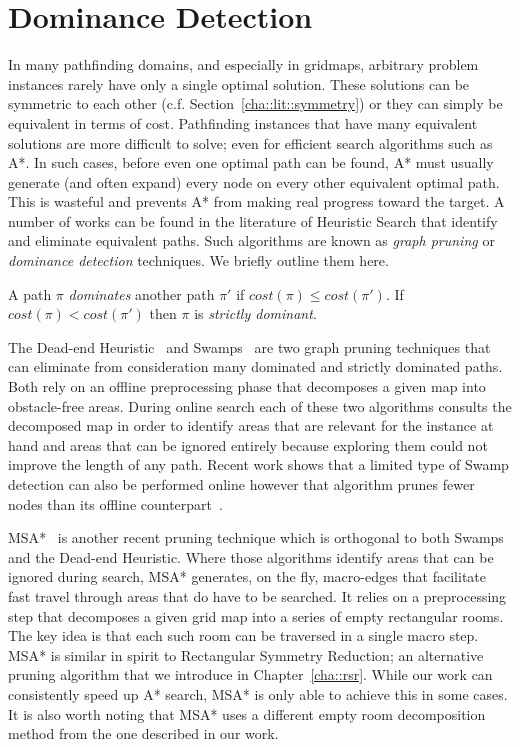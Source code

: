 \section{Dominance Detection}
\label{cha::lit::dominance}
In many pathfinding domains, and especially in gridmaps, arbitrary problem
instances rarely have only a single optimal solution. These solutions can be
symmetric to each other (c.f. Section~\ref{cha::lit::symmetry}) or they can
simply be equivalent in terms of cost.  Pathfinding instances that have many
equivalent solutions are more difficult to solve; even for efficient search
algorithms such as A{*}. In such cases, before even one optimal path can be
found, A{*} must usually generate (and often expand) every node on every other
equivalent optimal path.  This is wasteful and prevents A{*} from making real
progress toward the target.  A number of works can be found in the literature
of Heuristic Search that identify and eliminate equivalent paths. Such
algorithms are known as \emph{graph pruning} or \emph{dominance detection}
techniques. We briefly outline them here.

\begin{definition}
A path $\pi$ \emph{dominates} another path $\pi'$ if $cost(\pi) \leq cost(\pi')$. 
If $cost(\pi) < cost(\pi')$ then $\pi$ is \emph{strictly dominant}.
\end{definition}

The Dead-end Heuristic~\citep{bjornsson06} and
Swamps~\citep{pochter09,pochter10} are two graph pruning techniques that can
eliminate from consideration many dominated and strictly dominated paths.
Both rely on an offline preprocessing phase that decomposes a given map into
obstacle-free areas.  During online search each of these two algorithms
consults the decomposed map in order to identify areas that are relevant for
the instance at hand and areas that can be ignored entirely because exploring
them could not improve the length of any path. Recent work shows that a limited 
type of Swamp detection can also be performed online however that algorithm 
prunes fewer nodes than its offline counterpart~\cite{DBLP:conf/socs/SharonSF13}.

MSA{*}~\citep{bolanca09} is another recent pruning technique which is
orthogonal to both Swamps and the Dead-end Heuristic.  Where those algorithms
identify areas that can be ignored during search, MSA{*} generates, on the
fly, macro-edges that facilitate fast travel through areas that do have to be
searched.  It relies on a preprocessing step that decomposes a given grid map
into a series of empty rectangular rooms. The key idea is that each such room
can be traversed in a single macro step. MSA{*} is similar in spirit to
Rectangular Symmetry Reduction; an alternative pruning algorithm that we
introduce in Chapter~\ref{cha::rsr}.  While our work can consistently speed up
A{*} search, MSA{*} is only able to achieve this in some cases.  It is also
worth noting that MSA{*} uses a different empty room decomposition method from
the one described in our work.

